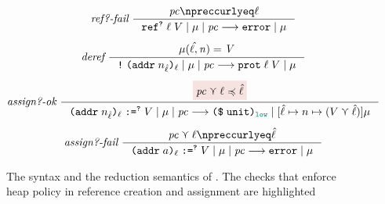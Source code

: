 \begin{figure}[tbp]
{\begin{gather*}
  \\[1ex]
  \textit{ref?-fail}~
  \inference
  {\pc \npreccurlyeq \ell}
  {\reduce{\dynref{?}{\ell}{V}}{\mu}{\pc}{\key{error}}{\mu}}
  \\[1ex]
  \textit{deref}~
  \inference
  {\mathit{\mu(\hat{\ell},n) = V}}
  {\reduce{\dynderef{\dynaddr{n_{\hat{\ell}}}{\ell}}}{\mu}{\pc}{\dynprot{\ell}{V}}{\mu}}
  \\[1ex]
  \textit{assign?-ok}~
  \inference
  {\highlightred{\pc \curlyvee \ell \preccurlyeq \hat{\ell}}}
  {\reduce{\dynassign{\dynaddr{n_{\hat{\ell}}}{\ell}}{?}{V}}{\mu}{\pc}{\dynconst{\unit}{\low}}{[\hat{\ell} \mapsto n \mapsto (V \curlyvee \hat{\ell})] \mu}}
  \\[1ex]
  \textit{assign?-fail}~
  \inference
  {\pc \curlyvee \ell \npreccurlyeq \hat{\ell}}
  {\reduce{\dynassign{\dynaddr{a}{\ell}}{?}{V}}{\mu}{\pc}{\key{error}}{\mu}}
  \end{gather*}}
  \caption{The syntax and the reduction semantics of \DynIFC. The checks that
    enforce heap policy in reference creation and assignment are highlighted}
  \label{fig:dyn-ifc}
\end{figure}
